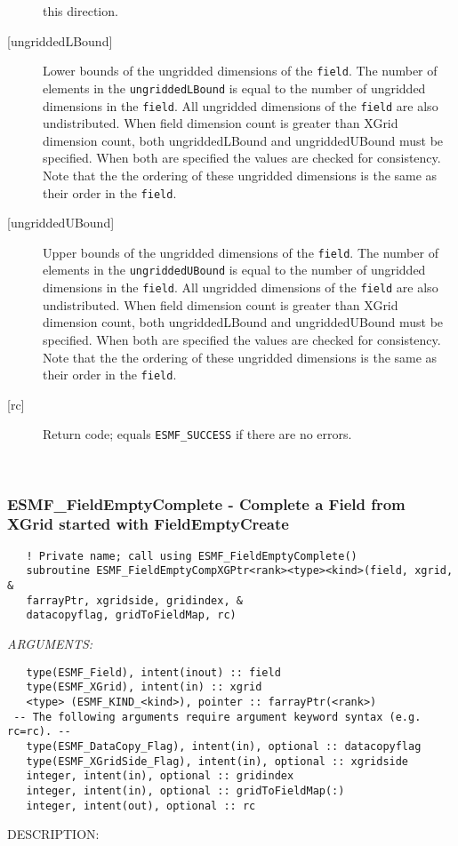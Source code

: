 \begin{description}
   this direction. 
   \item [{[ungriddedLBound]}] 
   Lower bounds of the ungridded dimensions of the {\tt field}. 
   The number of elements in the {\tt ungriddedLBound} is equal to the number of ungridded 
   dimensions in the {\tt field}. All ungridded dimensions of the 
   {\tt field} are also undistributed. When field dimension count is 
   greater than XGrid dimension count, both ungriddedLBound and ungriddedUBound 
   must be specified. When both are specified the values are checked 
   for consistency. Note that the the ordering of 
   these ungridded dimensions is the same as their order in the {\tt field}. 
   \item [{[ungriddedUBound]}] 
   Upper bounds of the ungridded dimensions of the {\tt field}. 
   The number of elements in the {\tt ungriddedUBound} is equal to the number of ungridded 
   dimensions in the {\tt field}. All ungridded dimensions of the 
   {\tt field} are also undistributed. When field dimension count is 
   greater than XGrid dimension count, both ungriddedLBound and ungriddedUBound 
   must be specified. When both are specified the values are checked 
   for consistency. Note that the the ordering of 
   these ungridded dimensions is the same as their order in the {\tt field}. 
   \item [{[rc]}] 
   Return code; equals {\tt ESMF\_SUCCESS} if there are no errors. 
   \end{description} 
    
 
\mbox{}\hrulefill\ 
 
\subsubsection [ESMF\_FieldEmptyComplete] {ESMF\_FieldEmptyComplete - Complete a Field from XGrid started with FieldEmptyCreate }


   
\begin{verbatim}   ! Private name; call using ESMF_FieldEmptyComplete() 
   subroutine ESMF_FieldEmptyCompXGPtr<rank><type><kind>(field, xgrid, & 
   farrayPtr, xgridside, gridindex, & 
   datacopyflag, gridToFieldMap, rc) 
   \end{verbatim}{\em ARGUMENTS:}
\begin{verbatim}   type(ESMF_Field), intent(inout) :: field 
   type(ESMF_XGrid), intent(in) :: xgrid 
   <type> (ESMF_KIND_<kind>), pointer :: farrayPtr(<rank>) 
 -- The following arguments require argument keyword syntax (e.g. rc=rc). --
   type(ESMF_DataCopy_Flag), intent(in), optional :: datacopyflag 
   type(ESMF_XGridSide_Flag), intent(in), optional :: xgridside 
   integer, intent(in), optional :: gridindex 
   integer, intent(in), optional :: gridToFieldMap(:) 
   integer, intent(out), optional :: rc 
   \end{verbatim}
{\sf DESCRIPTION:\\ }

